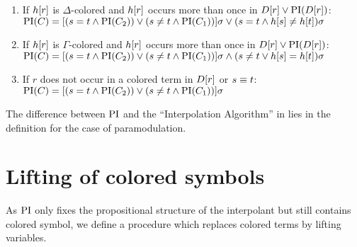 \begin{defi}
\begin{itemize}
\begin{enumerate}
        \item If $h[r]$ is $\Delta$-colored and $h[r]$ occurs more than once in $D[r] \lor \operatorname{PI}(D[r])$:
          \label{def:PI_paramod_1}
          \newline
          $\operatorname{PI}(C) = [ ( s=t \land \operatorname{PI}(C_2) ) \lor (s\neq t \land \operatorname{PI}(C_1)) ]\sigma \lor (s=t \land h[s] \neq      h[t])\sigma$
        \item If $h[r]$ is $\Gamma$-colored and $h[r]$ occurs more than once in $D[r] \lor \operatorname{PI}(D[r])$:
          \label{def:PI_paramod_2}
          \newline
          $\operatorname{PI}(C) = [ ( s=t \land \operatorname{PI}(C_2) ) \lor (s\neq t \land \operatorname{PI}(C_1)) ]\sigma \land (s\neq t \lor h[s] =     h[t])\sigma$
				\item If $r$ does not occur in a colored term in $D[r]$ {\color{red} or $s\equiv t$}:
          \label{def:PI_paramod_3}
          \newline
          $\operatorname{PI}(C) = [ ( s=t \land \operatorname{PI}(C_2) ) \lor (s\neq t \land \operatorname{PI}(C_1)) ]\sigma$ \qedhere

      \end{enumerate}

  \end{itemize}
\end{defi}


The difference between $\operatorname{PI}$ and the ``Interpolation Algorithm'' in \cite{Huang95} lies in the definition for the case of paramodulation.
\mytodo{}


\section{Lifting of colored symbols}
As $\operatorname{PI}$ only fixes the propositional structure of the interpolant but still contains colored symbol, 
we define a procedure which replaces colored terms by lifting variables.


